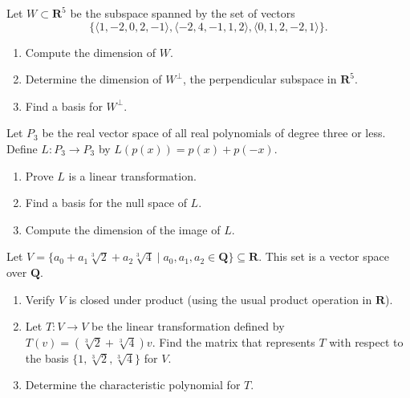 \documentclass[11pt,twoside,openany]{memoir}
\begin{document}
    \begin{exercise}
    Let $W\subset \mathbf{R}^5$ be the subspace spanned by the set of vectors $$\{\langle 1,-2,0,2,-1\rangle,\langle -2,4,-1,1,2\rangle,\langle 0,1,2,-2,1\rangle\}.$$
    \begin{enumerate}[label = (\arabic*)]
        \item Compute the dimension of $W$.
        \item Determine the dimension of $W^\perp$, the perpendicular subspace in $\mathbf{R}^5$.
        \item Find a basis for $W^\perp$.
    \end{enumerate}
    \end{exercise}
    
    \newpage
    \begin{exercise}
    Let $P_3$ be the real vector space of all real polynomials of degree three or less. Define $L:P_3\to P_3$ by $L(p(x))=p(x)+p(-x)$.
    \begin{enumerate}[label = (\arabic*)]
        \item Prove $L$ is a linear transformation.
        \item Find a basis for the null space of $L$.
        \item Compute the dimension of the image of $L$.
    \end{enumerate}
    \end{exercise}
    
    \begin{exercise}
    Let $V=\{a_0+a_1\sqrt[3]{2}+a_2\sqrt[3]{4}\mid a_0, a_1, a_2\in \mathbf{Q}\}\subseteq \mathbf{R}$. This set is a vector space over $\mathbf{Q}$.
    \begin{enumerate}[label = (\arabic*)]
        \item Verify $V$ is closed under product (using the usual product operation in $\mathbf{R}$).
        \item Let $T:V\to V$ be the linear transformation defined by $T(v)=(\sqrt[3]{2}+\sqrt[3]{4}) v$. Find the matrix that represents $T$ with respect to the basis $\{1,\sqrt[3]{2},\sqrt[3]{4}\}$ for $V$.
        \item Determine the characteristic polynomial for $T$.
    \end{enumerate}
    \end{exercise}
\end{document}
